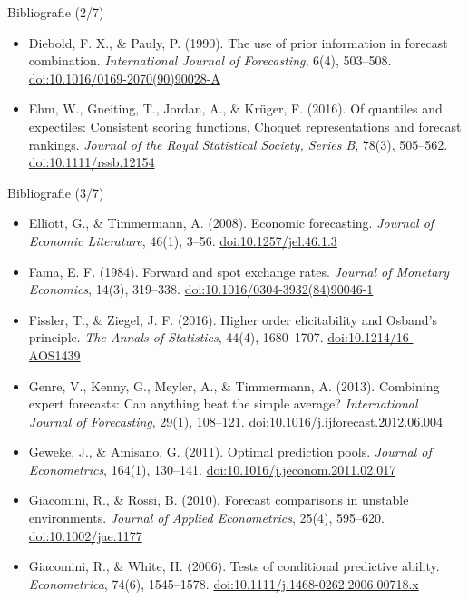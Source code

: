 \begin{frame}{Bibliografie (2/7)}
\begin{itemize}
    \item Diebold, F. X., \& Pauly, P. (1990). The use of prior information in forecast combination. \textit{International Journal of Forecasting}, 6(4), 503--508. \href{https://doi.org/10.1016/0169-2070(90)90028-A}{doi:10.1016/0169-2070(90)90028-A}
    \item Ehm, W., Gneiting, T., Jordan, A., \& Krüger, F. (2016). Of quantiles and expectiles: Consistent scoring functions, Choquet representations and forecast rankings. \textit{Journal of the Royal Statistical Society, Series B}, 78(3), 505--562. \href{https://doi.org/10.1111/rssb.12154}{doi:10.1111/rssb.12154}
\end{itemize}
\end{frame}

\begin{frame}{Bibliografie (3/7)}
\itemsize{\tiny}
\begin{itemize}
    \item Elliott, G., \& Timmermann, A. (2008). Economic forecasting. \textit{Journal of Economic Literature}, 46(1), 3--56. \href{https://doi.org/10.1257/jel.46.1.3}{doi:10.1257/jel.46.1.3}
    \item Fama, E. F. (1984). Forward and spot exchange rates. \textit{Journal of Monetary Economics}, 14(3), 319--338. \href{https://doi.org/10.1016/0304-3932(84)90046-1}{doi:10.1016/0304-3932(84)90046-1}
    \item Fissler, T., \& Ziegel, J. F. (2016). Higher order elicitability and Osband's principle. \textit{The Annals of Statistics}, 44(4), 1680--1707. \href{https://doi.org/10.1214/16-AOS1439}{doi:10.1214/16-AOS1439}
    \item Genre, V., Kenny, G., Meyler, A., \& Timmermann, A. (2013). Combining expert forecasts: Can anything beat the simple average? \textit{International Journal of Forecasting}, 29(1), 108--121. \href{https://doi.org/10.1016/j.ijforecast.2012.06.004}{doi:10.1016/j.ijforecast.2012.06.004}
    \item Geweke, J., \& Amisano, G. (2011). Optimal prediction pools. \textit{Journal of Econometrics}, 164(1), 130--141. \href{https://doi.org/10.1016/j.jeconom.2011.02.017}{doi:10.1016/j.jeconom.2011.02.017}
    \item Giacomini, R., \& Rossi, B. (2010). Forecast comparisons in unstable environments. \textit{Journal of Applied Econometrics}, 25(4), 595--620. \href{https://doi.org/10.1002/jae.1177}{doi:10.1002/jae.1177}
    \item Giacomini, R., \& White, H. (2006). Tests of conditional predictive ability. \textit{Econometrica}, 74(6), 1545--1578. \href{https://doi.org/10.1111/j.1468-0262.2006.00718.x}{doi:10.1111/j.1468-0262.2006.00718.x}

\end{itemize}
\end{frame}
